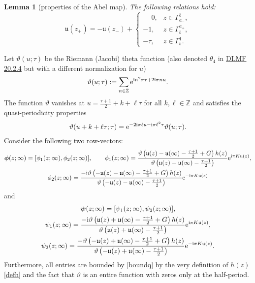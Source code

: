 \documentclass[pdftex]{sigma}
\numberwithin{equation}{section}
\newtheorem{Lemma}[Theorem]{Lemma}
\theoremstyle{definition}
\def\Abel{\mathfrak u}
\def\le{\left}
\def \bs{\boldsymbol}
\def\ri{\right}
\def\nn{\nonumber}
\def\be{\begin{equation}}
\def\ee{\end{equation}}
\def\Z{{\mathbb Z}}
\begin{document}
\begin{Lemma}[properties of the Abel map]\label{lemmaAbel}
The following relations hold:
\[
\Abel(z_+)=-\Abel(z_-) +
\begin{cases}
\phantom{-}0,& z\in \Gamma_{a_-}^b,\\
-1,& z\in \Gamma_b^{a_+},\\
-\tau, & z\in \Gamma_b^1.
\end{cases}
\]
\end{Lemma}
Let $\vartheta(u;\tau)$ be the Riemann (Jacobi) theta function (also denoted $\theta_4$ in \href{https://dlmf.nist.gov/20.2.E4}{DLMF 20.2.4} but with a different normalization for $u$)
\[
\vartheta(u;\tau) := \sum_{n\in \Z} {\rm e}^{{\rm i}n^2\pi \tau + 2{\rm i}\pi n u}.
\]
The function $\vartheta$ vanishes at $u = \frac {\tau + 1}2 + k + \ell \tau$ for all $k, \ell\in \Z$ and satisfies the quasi-periodicity properties
\be
\vartheta(u+k+ \ell \tau;\tau) = {\rm e}^{-2{\rm i}\pi \ell u - {\rm i}\pi \ell^2 \tau}\vartheta(u;\tau).
\label{thetaperiods}
\ee
Consider the following two row-vectors:
\begin{gather}
\bs \phi (z;\infty)= [\phi_1(z;\infty), \phi_2(z;\infty)],\qquad
\phi_1(z;\infty)= \frac { \vartheta\le(\Abel(z)-\Abel(\infty) - \frac {\tau+1}2 +
G\ri)h(z)}{\vartheta\le(\Abel(z)-\Abel(\infty) - \frac{\tau+1}2\ri)}{\rm e}^{{\rm i}\pi K \Abel(z)},
\nonumber\\
\phi_2(z;\infty)= \frac {-{\rm i} \vartheta\le(-\Abel(z)-\Abel(\infty) - \frac {\tau+1}2 +
G\ri)h(z)}{\vartheta\le(-\Abel(z)-\Abel(\infty) - \frac{\tau+1}2\ri)}{\rm e}^{-{\rm i}\pi K \Abel(z)}
\label{rowphi}
\end{gather}
and
\begin{gather}
\bs\psi(z;\infty) = [\psi_1(z;\infty), \psi_2(z;\infty)],\nn\\
\psi_1(z;\infty) = \frac {-{\rm i} \vartheta\le(\Abel(z)+\Abel(\infty) - \frac {\tau+1}2 +
G\ri)h(z)}{\vartheta\le(\Abel(z)+\Abel(\infty) - \frac{\tau+1}2\ri)}{\rm e}^{{\rm i}\pi K \Abel(z)},
\nn\\
\psi_2(z;\infty) = \frac { -\vartheta\le(-\Abel(z)+\Abel(\infty) - \frac {\tau+1}2 +
G\ri)h(z)}{\vartheta\le(-\Abel(z)+\Abel(\infty) - \frac{\tau+1}2\ri)}{\rm e}^{-{\rm i}\pi K \Abel(z)}.
\label{rowpsi}
\end{gather}
Furthermore, all entries are bounded by \eqref{boundq} by the very definition of $h(z)$ \eqref{defh} and the fact that $\vartheta$ is an entire function with zeros only at the half-period.
\end{document}

